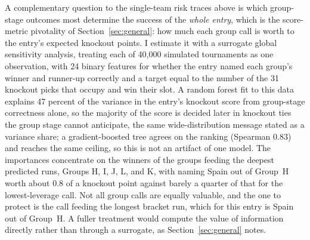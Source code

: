 \documentclass[11pt,a4paper]{article}
\begin{document}
A complementary question to the single-team risk traces above is which group-stage outcomes most determine the success of the \emph{whole entry}, which is the score-metric pivotality of Section~\ref{sec:general}: how much each group call is worth to the entry's expected knockout points. I estimate it with a surrogate global sensitivity analysis, treating each of 40{,}000 simulated tournaments as one observation, with 24 binary features for whether the entry named each group's winner and runner-up correctly and a target equal to the number of the 31 knockout picks that occupy and win their slot. A random forest fit to this data explains 47 percent of the variance in the entry's knockout score from group-stage correctness alone, so the majority of the score is decided later in knockout ties the group stage cannot anticipate, the same wide-distribution message stated as a variance share; a gradient-boosted tree agrees on the ranking (Spearman 0.83) and reaches the same ceiling, so this is not an artifact of one model. The importances concentrate on the winners of the groups feeding the deepest predicted runs, Groups H, I, J, L, and K, with naming Spain out of Group~H worth about 0.8 of a knockout point against barely a quarter of that for the lowest-leverage call. Not all group calls are equally valuable, and the one to protect is the call feeding the longest bracket run, which for this entry is Spain out of Group~H. A fuller treatment would compute the value of information directly rather than through a surrogate, as Section~\ref{sec:general} notes.
\end{document}
